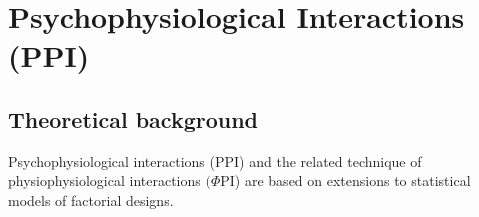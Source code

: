 \chapter{Psychophysiological Interactions (PPI)\label{Chap:data:ppi}}

\section{Theoretical background}

Psychophysiological interactions (PPI) and the related technique of physiophysiological interactions \((\Phi\)PI) are based on extensions to statistical models of factorial designs. 






